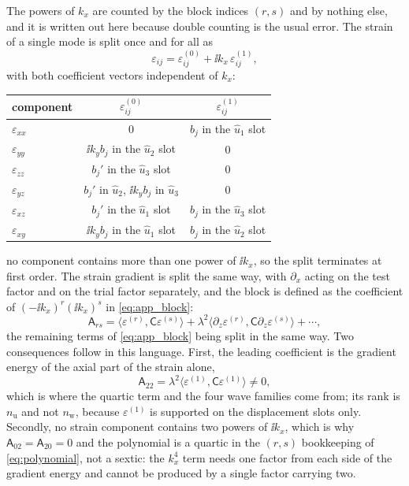 The powers of $k_x$ are counted by the block indices $(r,s)$ and by nothing else,
and it is written out here because double counting is the usual error.
The strain of a single mode is split once and for all as
\begin{equation*}
\varepsilon_{ij}=\varepsilon^{(0)}_{ij}+\ii k_x\,\varepsilon^{(1)}_{ij},
\end{equation*}
with both coefficient vectors independent of $k_x$:
\begin{center}
\renewcommand{\arraystretch}{1.1}
\begin{tabular}{@{}lcc@{}}
\toprule
component & $\varepsilon^{(0)}_{ij}$ & $\varepsilon^{(1)}_{ij}$ \\
\midrule
$\varepsilon_{xx}$ & $0$ & $b_j$ in the $\widehat u_1$ slot \\
$\varepsilon_{yy}$ & $\ii k_yb_j$ in the $\widehat u_2$ slot & $0$ \\
$\varepsilon_{zz}$ & $b_j'$ in the $\widehat u_3$ slot & $0$ \\
$\varepsilon_{yz}$ & $b_j'$ in $\widehat u_2$, $\ii k_yb_j$ in $\widehat u_3$ & $0$ \\
$\varepsilon_{xz}$ & $b_j'$ in the $\widehat u_1$ slot & $b_j$ in the $\widehat u_3$ slot \\
$\varepsilon_{xy}$ & $\ii k_yb_j$ in the $\widehat u_1$ slot & $b_j$ in the $\widehat u_2$ slot \\
\bottomrule
\end{tabular}
\end{center}
no component contains more than one power of $\ii k_x$, so the split terminates at
first order.  The strain gradient is split the same way, with $\partial_x$ acting
on the test factor and on the trial factor separately, and the block is defined as
the coefficient of $(-\ii k_x)^{r}(\ii k_x)^{s}$ in \eqref{eq:app_block}:
\begin{equation*}
\mathsf A_{rs}=\bigl\langle\varepsilon^{(r)},\mathsf C\varepsilon^{(s)}\bigr\rangle
+\lambda^{2}\bigl\langle\partial_z\varepsilon^{(r)},\mathsf C\partial_z\varepsilon^{(s)}\bigr\rangle
+\cdots ,
\end{equation*}
the remaining terms of \eqref{eq:app_block} being split in the same way.  Two consequences follow in this language.  First, the leading coefficient
is the gradient energy of the axial part of the strain alone,
\begin{equation}
\label{eq:app_A22}
\mathsf A_{22}=\lambda^{2}\bigl\langle\varepsilon^{(1)},\mathsf C\varepsilon^{(1)}\bigr\rangle
\neq0 ,
\end{equation}
which is where the quartic term and the four wave families come from; its rank is $n_{\mathrm u}$ and not $n_{\mathrm w}$, because $\varepsilon^{(1)}$ is
supported on the displacement slots only.  Secondly, no strain component contains
two powers of $\ii k_x$, which is why $\mathsf A_{02}=\mathsf A_{20}=0$ and the polynomial is a quartic in the $(r,s)$ bookkeeping of \eqref{eq:polynomial}, not a sextic: the
$k_x^{4}$ term needs one factor from each side of the gradient energy and cannot
be produced by a single factor carrying two.

